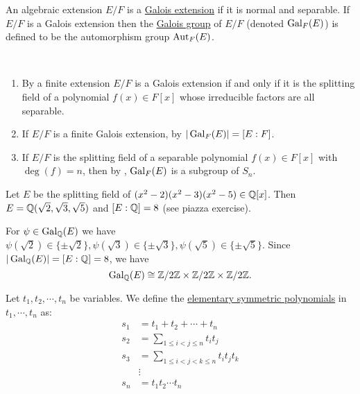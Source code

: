 \documentclass[11pt]{article}
\begin{document}
\begin{definition}
    An algebraic extension $E/F$ is a \ul{Galois extension} if it is normal and separable. If $E/F$ is a Galois extension then the \ul{Galois group} of $E/F$ (denoted $\operatorname{Gal}_F(E)$) is defined to be the automorphism group $\operatorname{Aut}_F(E)$.
\end{definition}

\begin{remark}\,
    \begin{enumerate}
        \item By  a finite extension $E/F$ is a Galois extension if and only if it is the splitting field of a polynomial $f(x)\in F[x]$ whose irreducible factors are all separable.
        \item If $E/F$ is a finite Galois extension, by  $|\operatorname{Gal}_F(E)|=[E:F]$.
        \item If $E/F$ is the splitting field of a separable polynomial $f(x)\in F[x]$ with $\deg(f)=n$, then by , $\operatorname{Gal}_F(E)$ is a subgroup of $S_n$.
    \end{enumerate}
\end{remark}

\begin{example}
    Let $E$ be the splitting field of $(x^2-2)(x^2-3)(x^2-5)\in\mathbb{Q}[x]$. Then $E=\mathbb{Q}(\sqrt{2},\sqrt{3},\sqrt{5})$ and $[E:\mathbb{Q}]=8$ (see piazza exercise).

    For $\psi\in\operatorname{Gal}_{\mathbb{Q}}(E)$ we have $\psi(\sqrt{2})\in\{\pm\sqrt{2}\},\psi(\sqrt{3})\in\{\pm\sqrt{3}\},\psi(\sqrt{5})\in\{\pm\sqrt{5}\}$. Since $|\operatorname{Gal}_{\mathbb{Q}}(E)|=[E:\mathbb{Q}]=8$, we have
    \[\operatorname{Gal}_{\mathbb{Q}}(E)\cong\mathbb{Z}/2\mathbb{Z}\times\mathbb{Z}/2\mathbb{Z}\times\mathbb{Z}/2\mathbb{Z}.\]
\end{example}

\begin{definition}
    Let $t_1,t_2,\cdots,t_n$ be variables. We define the \ul{elementary symmetric polynomials} in $t_1,\cdots,t_n$ as:
    \begin{align*}
        s_1&=t_1+t_2+\cdots+t_n \\
        s_2&=\sum\limits_{1\leq i<j\leq n}t_it_j \\
        s_3&=\sum\limits_{1\leq i<j<k\leq n}t_it_jt_k \\
        &\vdots \\
        s_n&=t_1t_2\cdots t_n
    \end{align*}
\end{definition}
\end{document}
